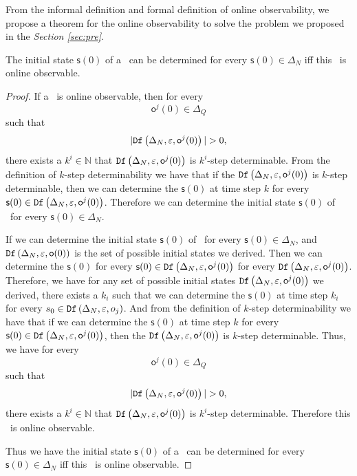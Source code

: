 From the informal definition and formal definition of online observability, we propose a theorem for the online observability to solve the problem we proposed in the {\em Section \ref{sec:pre}}.
\begin{theorem}
The initial state $\mathsf{s}(0)$ of a \BCN\ can be determined for every $\mathsf{s}(0)\in \Delta_N$ iff this \BCN\ is online observable. 
\label{theo:1}
\end{theorem}
\begin{proof}
 If a \BCN\ is online observable,
then for every  \[\mathsf{o}^{j}(0)\in \Delta_Q\] such that \[|\Ded\left(\Delta_N,\varepsilon, \mathsf{o}^{j}(0)\right)|> 0,\] there exists a $k^{i}\in \mathbb{N}$ that ${\tt Df}\left(\Delta_N,\varepsilon,\mathsf{o}^{j}(0)\right)$ is $k^{i}$-step determinable. From the definition of $k$-step determinability we have that if the ${\tt Df}\left(\Delta_N,\varepsilon,\mathsf{o}^{j}(0)\right)$ is $k$-step determinable, then we can determine the $\mathsf{s}(0)$ at time step $k$ for every $\mathsf{s}(0) \in {\tt Df}\left(\Delta_N,\varepsilon,\mathsf{o}^{j}(0)\right)$. Therefore we can determine the initial state $\mathsf{s}(0)$ of \BCNs\ for every $\mathsf{s}(0)\in \Delta_N$.

If we can determine the initial state $\mathsf{s}(0)$ of \BCNs\ for every $\mathsf{s}(0)\in \Delta_N$, and ${\tt Df}\left(\Delta_N,\varepsilon,\mathsf{o}(0)\right)$ is the set of possible initial states we derived. Then we can determine the $\mathsf{s}(0)$ for every $\mathsf{s}(0) \in {\tt Df}\left(\Delta_N,\varepsilon,\mathsf{o}^{j}(0)\right)$ for every ${\tt Df}\left(\Delta_N,\varepsilon,\mathsf{o}^{j}(0)\right)$. Therefore, we have for any set of possible initial states ${\tt Df}\left(\Delta_N,\varepsilon, \mathsf{o}^{j}(0)\right)$ we derived, there exists a $k_i$ such that we can determine the $\mathsf{s}(0)$ at time step $k_i$ for every $s_0\in {\tt Df}\left(\Delta_N,\varepsilon,o_j\right)$. And from the definition of $k$-step determinability we have that if we can determine the $\mathsf{s}(0)$ at time step $k$ for every $\mathsf{s}(0) \in {\tt Df}\left(\Delta_N,\varepsilon,\mathsf{o}^{j}(0)\right)$, then the ${\tt Df}\left(\Delta_N,\varepsilon,\mathsf{o}^{j}(0)\right)$ is $k$-step determinable.
 Thus, we have for every  \[\mathsf{o}^{j}(0)\in \Delta_Q\] such that \[|\Ded\left(\Delta_N,\varepsilon, \mathsf{o}^{j}(0)\right)|> 0,\] there exists a $k^{i}\in \mathbb{N}$ that ${\tt Df}\left(\Delta_N,\varepsilon,\mathsf{o}^{j}(0)\right)$ is $k^{i}$-step determinable. Therefore this \BCN\ is online observable.

Thus we have the initial state $\mathsf{s}(0)$ of a \BCN\ can be determined for every $\mathsf{s}(0)\in \Delta_N$ iff this \BCN\ is online observable. 
\end{proof}

